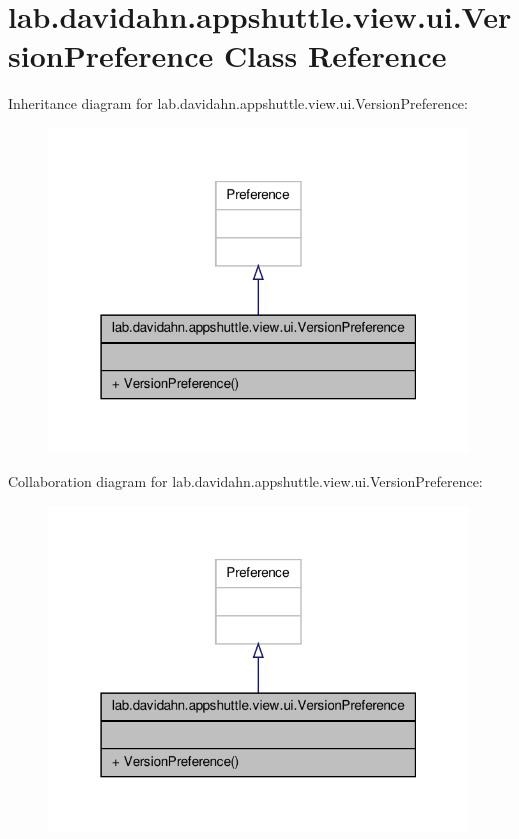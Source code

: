 \hypertarget{classlab_1_1davidahn_1_1appshuttle_1_1view_1_1ui_1_1_version_preference}{\section{lab.\-davidahn.\-appshuttle.\-view.\-ui.\-Version\-Preference \-Class \-Reference}
\label{classlab_1_1davidahn_1_1appshuttle_1_1view_1_1ui_1_1_version_preference}
}


\-Inheritance diagram for lab.\-davidahn.\-appshuttle.\-view.\-ui.\-Version\-Preference\-:
\nopagebreak
\begin{figure}[H]
\begin{center}
\leavevmode
\includegraphics[width=316pt]{classlab_1_1davidahn_1_1appshuttle_1_1view_1_1ui_1_1_version_preference__inherit__graph}
\end{center}
\end{figure}


\-Collaboration diagram for lab.\-davidahn.\-appshuttle.\-view.\-ui.\-Version\-Preference\-:
\nopagebreak
\begin{figure}[H]
\begin{center}
\leavevmode
\includegraphics[width=316pt]{classlab_1_1davidahn_1_1appshuttle_1_1view_1_1ui_1_1_version_preference__coll__graph}
\end{center}
\end{figure}
